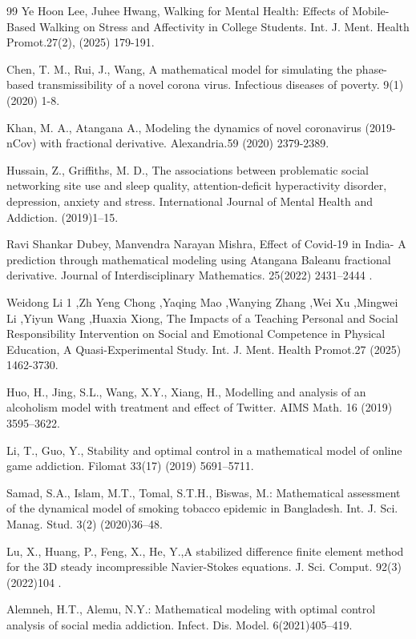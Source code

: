 \documentclass[10pt]{NSP1}
\numberwithin{equation}{section}
\begin{document}
\begin{thebibliography}{99}
Ye Hoon Lee, Juhee Hwang, Walking for Mental Health: Effects of Mobile-Based Walking on Stress and Affectivity in College Students. Int. J. Ment. Health Promot.27(2), (2025) 179-191.

Chen, T. M., Rui, J., Wang, A mathematical model for simulating the phase-based transmissibility of a novel corona virus. Infectious diseases of poverty. 9(1)(2020) 1-8.

Khan, M. A., Atangana A., Modeling the dynamics of novel coronavirus (2019-nCov) with fractional derivative. Alexandria.59 (2020) 2379-2389.

Hussain, Z., Griffiths, M. D., The associations between problematic social networking site use and sleep quality, attention-deficit hyperactivity disorder, depression, anxiety and stress. International Journal of Mental Health and Addiction. (2019)1–15.

Ravi Shankar Dubey, Manvendra Narayan Mishra, Effect of Covid-19 in India- A prediction through mathematical modeling using Atangana Baleanu fractional derivative. Journal of Interdisciplinary Mathematics. 25(2022) 2431–2444 .

Weidong Li 1 ,Zh Yeng Chong ,Yaqing Mao ,Wanying Zhang ,Wei Xu ,Mingwei Li ,Yiyun Wang ,Huaxia Xiong, The Impacts of a Teaching Personal and Social Responsibility Intervention on Social and Emotional Competence in Physical Education, A Quasi-Experimental Study. Int. J. Ment. Health Promot.27 (2025) 1462-3730.

Huo, H., Jing, S.L., Wang, X.Y., Xiang, H., Modelling and analysis of an alcoholism model with treatment and effect of Twitter. AIMS Math. 16 (2019) 3595–3622.

Li, T., Guo, Y., Stability and optimal control in a mathematical model of online game addiction. Filomat 33(17) (2019) 5691–5711.

Samad, S.A., Islam, M.T., Tomal, S.T.H., Biswas, M.: Mathematical assessment of the dynamical model of smoking tobacco epidemic in Bangladesh. Int. J. Sci. Manag. Stud. 3(2) (2020)36–48.

Lu, X., Huang, P., Feng, X., He, Y.,A stabilized difference finite element method for the 3D steady incompressible Navier-Stokes equations. J. Sci. Comput. 92(3) (2022)104 .

Alemneh, H.T., Alemu, N.Y.: Mathematical modeling with optimal control analysis of social media addiction. Infect. Dis. Model. 6(2021)405–419.


\end{thebibliography}
\end{document}
